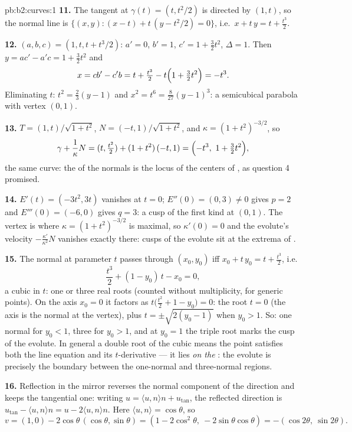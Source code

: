 \begin{solution}{pb:b2:curves:1}
\textbf{11.} The tangent at $\gamma(t) = (t, t^2/2)$ is
directed by $(1, t)$, so the normal line is $\{(x, y) : (x -
t) + t\,(y - t^2/2) = 0\}$, i.e.\ $x + t\,y = t +
\tfrac{t^3}2$.

\textbf{12.} $(a, b, c) = (1, t, t + t^3/2)$: $a' = 0$, $b' =
1$, $c' = 1 + \tfrac32 t^2$, $\Delta = 1$. Then $y = ac' -
a'c = 1 + \tfrac32t^2$ and
\[
x = cb' - c'b = t + \tfrac{t^3}2 - t\Bigl(1 +
\tfrac32t^2\Bigr) = -t^3 .
\]
Eliminating $t$: $t^2 = \tfrac23(y - 1)$ and $x^2 = t^6 =
\tfrac8{27}(y - 1)^3$: a semicubical parabola with vertex
$(0, 1)$.

\textbf{13.} $T = (1, t)/\sqrt{1+t^2}$, $N = (-t,
1)/\sqrt{1+t^2}$, and $\kappa = (1+t^2)^{-3/2}$, so
\[
\gamma + \frac1\kappa N = (t, \tfrac{t^2}2) +
(1+t^2)\,(-t, 1) = \Bigl(-t^3,\ 1 + \tfrac32t^2\Bigr),
\]
the same curve: the  of the normals is the locus of
the centers of , as question 4 promised.

\textbf{14.} $E'(t) = (-3t^2, 3t)$ vanishes at $t = 0$;
$E''(0) = (0, 3) \neq 0$ gives $p = 2$ and $E'''(0) = (-6,
0)$ gives $q = 3$: a cusp of the first kind at $(0, 1)$. The
vertex is where $\kappa = (1+t^2)^{-3/2}$ is maximal, so
$\kappa'(0) = 0$ and the evolute's velocity
$-\frac{\kappa'}{\kappa^2}N$ vanishes exactly there: cusps of
the evolute sit at the extrema of .

\textbf{15.} The normal at parameter $t$ passes through
$(x_0, y_0)$ iff $x_0 + t\,y_0 = t + \tfrac{t^3}2$, i.e.
\[
\frac{t^3}2 + (1 - y_0)\,t - x_0 = 0 ,
\]
a cubic in $t$: one or three real roots (counted without
multiplicity, for generic points). On the axis $x_0 = 0$ it
factors as $t\bigl(\tfrac{t^2}2 + 1 - y_0\bigr) = 0$: the
root $t = 0$ (the axis is the normal at the vertex), plus
$t = \pm\sqrt{2(y_0 - 1)}$ when $y_0 > 1$. So: one normal
for $y_0 < 1$, three for $y_0 > 1$, and at $y_0 = 1$ the
triple root marks the cusp of the evolute. In general a
double root of the cubic means the point satisfies both the
line equation and its $t$-derivative --- it lies \emph{on the
}: the evolute is precisely the boundary between the
one-normal and three-normal regions.

\textbf{16.} Reflection in the mirror reverses the normal
component of the direction and keeps the tangential one:
writing $u = \langle u, n\rangle n + u_{\mathrm{tan}}$, the
reflected direction is $u_{\mathrm{tan}} - \langle u,
n\rangle n = u - 2\langle u, n\rangle n$. Here $\langle u,
n\rangle = \cos\theta$, so
\[
v = (1, 0) - 2\cos\theta\,(\cos\theta, \sin\theta)
= (1 - 2\cos^2\theta,\ -2\sin\theta\cos\theta)
= -(\cos2\theta,\ \sin2\theta).
\]


\end{solution}
